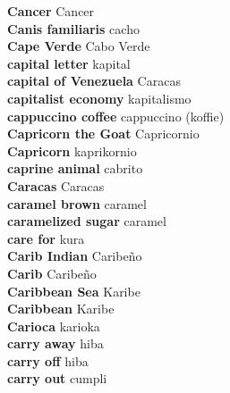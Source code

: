 \textbf{ Cancer  } Cancer \\
\textbf{ Canis familiaris  } cacho \\
\textbf{ Cape Verde  } Cabo Verde \\
\textbf{ capital letter  } kapital \\
\textbf{ capital of Venezuela  } Caracas \\
\textbf{ capitalist economy  } kapitalismo \\
\textbf{ cappuccino coffee  } cappuccino (koffie) \\
\textbf{ Capricorn the Goat  } Capricornio \\
\textbf{ Capricorn  } kaprikornio \\
\textbf{ caprine animal  } cabrito \\
\textbf{ Caracas  } Caracas \\
\textbf{ caramel brown  } caramel \\
\textbf{ caramelized sugar  } caramel \\
\textbf{ care for  } kura \\
\textbf{ Carib Indian  } Caribeño \\
\textbf{ Carib  } Caribeño \\
\textbf{ Caribbean Sea  } Karibe \\
\textbf{ Caribbean  } Karibe \\
\textbf{ Carioca  } karioka \\
\textbf{ carry away  } hiba \\
\textbf{ carry off  } hiba \\
\textbf{ carry out  } cumpli \\
